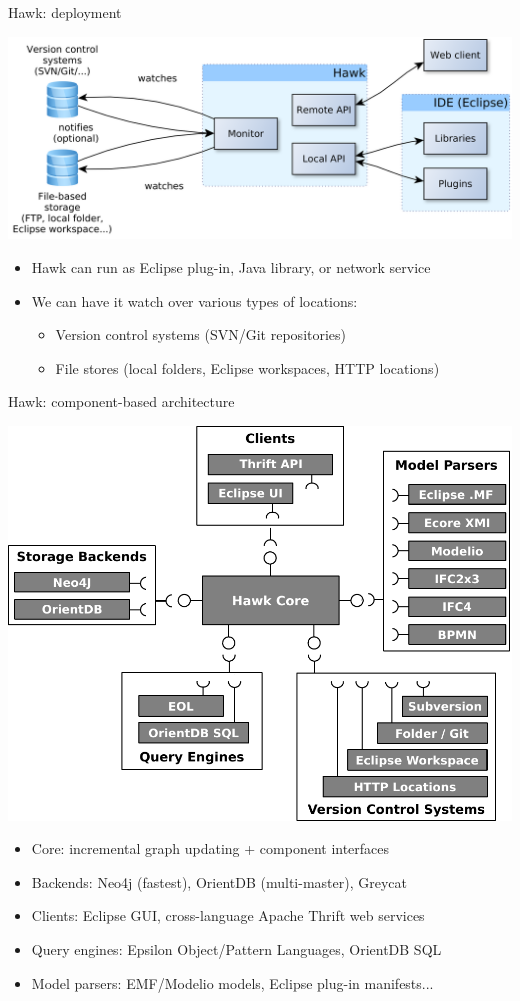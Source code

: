 \documentclass[10pt]{beamer}
\begin{document}
\begin{frame}{Hawk: deployment}

  \begin{center}
    \includegraphics[width=\textwidth]{hawk-deployment}
  \end{center}

  \begin{itemize}
  \item Hawk can run as Eclipse plug-in, Java library, or network service
  \item We can have it watch over various types of locations:
    \begin{itemize}
    \item Version control systems (SVN/Git repositories)
    \item File stores (local folders, Eclipse workspaces, HTTP locations)
    \end{itemize}
  \end{itemize}

\end{frame}

\begin{frame}{Hawk: component-based architecture}
  \begin{center}
    \includegraphics[width=.6\textwidth]{hawk-architecture}
  \end{center}

  \begin{itemize}
  \item Core: incremental graph updating + component interfaces
  \item Backends: Neo4j (fastest), OrientDB (multi-master), Greycat
  \item Clients: Eclipse GUI, cross-language Apache Thrift web services
  \item Query engines: Epsilon Object/Pattern Languages, OrientDB SQL
  \item Model parsers: EMF/Modelio models, Eclipse plug-in manifests...
  \end{itemize}
\end{frame}
\end{document}
